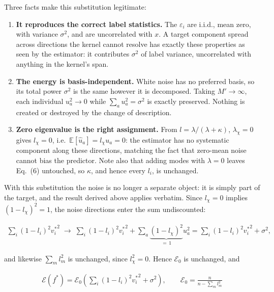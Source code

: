 Three facts make this substitution legitimate:

\begin{enumerate}
\item \textbf{It reproduces the correct label statistics.} The $\varepsilon_i$ are i.i.d.,
mean zero, with variance $\sigma^2$, and are uncorrelated with $x$. A target
component spread across directions the kernel cannot resolve has exactly these
properties as seen by the estimator: it contributes $\sigma^2$ of label variance,
uncorrelated with anything in the kernel's span.

\item \textbf{The energy is basis-independent.} White noise has no preferred basis,
so its total power $\sigma^2$ is the same however it is decomposed.
Taking $M'\to\infty$, each individual $u_a^2\to 0$ while $\sum_a u_a^2 = \sigma^2$
is exactly preserved. Nothing is created or destroyed by the change of description.

\item \textbf{Zero eigenvalue is the right assignment.} From $l = \lambda/(\lambda+\kappa)$,
$\lambda_\chi = 0$ gives $l_\chi = 0$, i.e.\ $\mathbb{E}[\hat u_a]=l_\chi u_a = 0$:
the estimator has no systematic component along these directions, matching the fact
that zero-mean noise cannot bias the predictor. Note also that adding modes with
$\lambda=0$ leaves Eq.~(6) untouched, so $\kappa$, and hence every $l_i$, is unchanged.
\end{enumerate}

With this substitution the noise is no longer a separate object: it is simply part
of the target, and the result derived above applies verbatim. Since $l_\chi=0$
implies $(1-l_\chi)^2=1$, the noise directions enter the sum undiscounted:

\begin{align}
    \sum_i (1-l_i)^2{v^*_i}^2 \;\longrightarrow\;
    \sum_i (1-l_i)^2 {v^*_i}^2 + \sum_a \underbrace{(1-l_\chi)^2}_{=\,1} u_a^2
    = \sum_i (1-l_i)^2{v^*_i}^2 + \sigma^2,
\end{align}

and likewise $\sum_m l^2_m$ is unchanged, since $l_\chi^2=0$. Hence $\mathcal{E}_0$
is unchanged, and

\begin{align}
\label{ch3-generalization-pred}
    \boxed{\;\mathcal{E}(f^*) = \mathcal{E}_0\left(\sum_i (1-l_i)^2{v^*_i}^2 + \sigma^2\right),
    \qquad \mathcal{E}_0 = \frac{n}{n-\sum_m l^2_m}\;}
\end{align}

